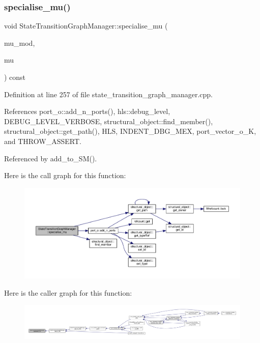 \subsubsection{\texorpdfstring{specialise\+\_\+mu()}{specialise\_mu()}}
{\footnotesize\ttfamily void State\+Transition\+Graph\+Manager\+::specialise\+\_\+mu (\begin{DoxyParamCaption}\item[{\hyperlink{structural__objects_8hpp_a8ea5f8cc50ab8f4c31e2751074ff60b2}{structural\+\_\+object\+Ref} \&}]{mu\+\_\+mod,  }\item[{\hyperlink{generic__obj_8hpp_acb533b2ef8e0fe72e09a04d20904ca81}{generic\+\_\+obj\+Ref}}]{mu }\end{DoxyParamCaption}) const}



Definition at line 257 of file state\+\_\+transition\+\_\+graph\+\_\+manager.\+cpp.



References port\+\_\+o\+::add\+\_\+n\+\_\+ports(), hls\+::debug\+\_\+level, D\+E\+B\+U\+G\+\_\+\+L\+E\+V\+E\+L\+\_\+\+V\+E\+R\+B\+O\+SE, structural\+\_\+object\+::find\+\_\+member(), structural\+\_\+object\+::get\+\_\+path(), H\+LS, I\+N\+D\+E\+N\+T\+\_\+\+D\+B\+G\+\_\+\+M\+EX, port\+\_\+vector\+\_\+o\+\_\+K, and T\+H\+R\+O\+W\+\_\+\+A\+S\+S\+E\+RT.



Referenced by add\+\_\+to\+\_\+\+S\+M().

Here is the call graph for this function\+:
\nopagebreak
\begin{figure}[H]
\begin{center}
\leavevmode
\includegraphics[width=350pt]{d9/dfd/classStateTransitionGraphManager_aece975a4f5bcb162267993d933d25945_cgraph}
\end{center}
\end{figure}
Here is the caller graph for this function\+:
\nopagebreak
\begin{figure}[H]
\begin{center}
\leavevmode
\includegraphics[width=350pt]{d9/dfd/classStateTransitionGraphManager_aece975a4f5bcb162267993d933d25945_icgraph}
\end{center}
\end{figure}


